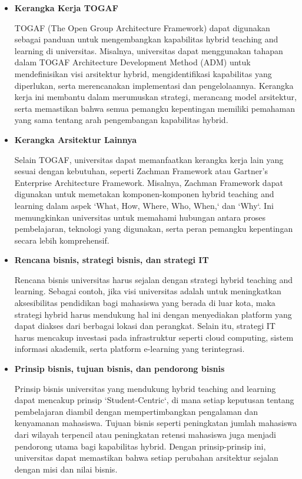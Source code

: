 \begin{itemize}
	\item \textbf{Kerangka Kerja TOGAF}
	
	TOGAF (The Open Group Architecture Framework) dapat digunakan sebagai panduan untuk mengembangkan kapabilitas hybrid teaching and learning di universitas. Misalnya, universitas dapat menggunakan tahapan dalam TOGAF Architecture Development Method (ADM) untuk mendefinisikan visi arsitektur hybrid, mengidentifikasi kapabilitas yang diperlukan, serta merencanakan implementasi dan pengelolaannya. Kerangka kerja ini membantu dalam merumuskan strategi, merancang model arsitektur, serta memastikan bahwa semua pemangku kepentingan memiliki pemahaman yang sama tentang arah pengembangan kapabilitas hybrid.
	
	\item \textbf{Kerangka Arsitektur Lainnya}
	
	Selain TOGAF, universitas dapat memanfaatkan kerangka kerja lain yang sesuai dengan kebutuhan, seperti Zachman Framework atau Gartner's Enterprise Architecture Framework. Misalnya, Zachman Framework dapat digunakan untuk memetakan komponen-komponen hybrid teaching and learning dalam aspek `What, How, Where, Who, When,` dan `Why`. Ini memungkinkan universitas untuk memahami hubungan antara proses pembelajaran, teknologi yang digunakan, serta peran pemangku kepentingan secara lebih komprehensif.
	
	\item \textbf{Rencana bisnis, strategi bisnis, dan strategi IT}
	
	Rencana bisnis universitas harus sejalan dengan strategi hybrid teaching and learning. Sebagai contoh, jika visi universitas adalah untuk meningkatkan aksesibilitas pendidikan bagi mahasiswa yang berada di luar kota, maka strategi hybrid harus mendukung hal ini dengan menyediakan platform yang dapat diakses dari berbagai lokasi dan perangkat. Selain itu, strategi IT harus mencakup investasi pada infrastruktur seperti cloud computing, sistem informasi akademik, serta platform e-learning yang terintegrasi.
	
	\item \textbf{Prinsip bisnis, tujuan bisnis, dan pendorong bisnis}
	
	Prinsip bisnis universitas yang mendukung hybrid teaching and learning dapat mencakup prinsip `Student-Centric`, di mana setiap keputusan tentang pembelajaran diambil dengan mempertimbangkan pengalaman dan kenyamanan mahasiswa. Tujuan bisnis seperti peningkatan jumlah mahasiswa dari wilayah terpencil atau peningkatan retensi mahasiswa juga menjadi pendorong utama bagi kapabilitas hybrid. Dengan prinsip-prinsip ini, universitas dapat memastikan bahwa setiap perubahan arsitektur sejalan dengan misi dan nilai bisnis.
	

\end{itemize}
